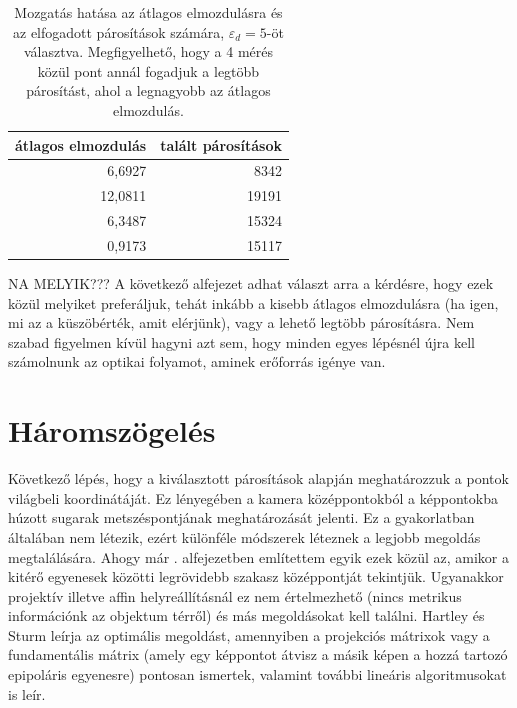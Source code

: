 \begin{table}[tbh]
\centering
\begin{tabular}{|r|r|}
\hline
\centering átlagos elmozdulás & talált párosítások \\\hline\hline
 6,6927 & 8342 \\\hline
12,0811 & 19191 \\\hline
 6,3487 & 15324 \\\hline
 0,9173 & 15117 \\\hline
\end{tabular}
\caption{Mozgatás hatása az átlagos elmozdulásra és az elfogadott párosítások számára, $\varepsilon_d = 5$-öt választva. Megfigyelhető, hogy a 4 mérés közül pont annál fogadjuk a legtöbb párosítást, ahol a legnagyobb az átlagos elmozdulás. \label{table:shifting}}
\end{table}

{\color{red}NA MELYIK???} A következő alfejezet adhat választ arra a kérdésre, hogy ezek közül melyiket preferáljuk, tehát inkább a kisebb átlagos elmozdulásra (ha igen, mi az a küszöbérték, amit elérjünk), vagy a lehető legtöbb párosításra. Nem szabad figyelmen kívül hagyni azt sem, hogy minden egyes lépésnél újra kell számolnunk az optikai folyamot, aminek erőforrás igénye van.


\section{Háromszögelés}

Következő lépés, hogy a kiválasztott párosítások alapján meghatározzuk a pontok világbeli koordinátáját. Ez lényegében a kamera középpontokból a képpontokba húzott sugarak metszéspontjának meghatározását jelenti. Ez a gyakorlatban általában nem létezik, ezért különféle módszerek léteznek a legjobb megoldás megtalálására. Ahogy már . alfejezetben említettem egyik ezek közül az, amikor a kitérő egyenesek közötti legrövidebb szakasz középpontját tekintjük. Ugyanakkor projektív illetve affin helyreállításnál ez nem értelmezhető (nincs metrikus információnk az objektum térről) \cite{hartley-triangulation, HZ} és más megoldásokat kell találni. Hartley és Sturm \cite{hartley-triangulation} leírja az optimális megoldást, amennyiben a projekciós mátrixok vagy a fundamentális mátrix (amely egy képpontot átvisz a másik képen a hozzá tartozó epipoláris egyenesre) pontosan ismertek, valamint további lineáris algoritmusokat is leír.

